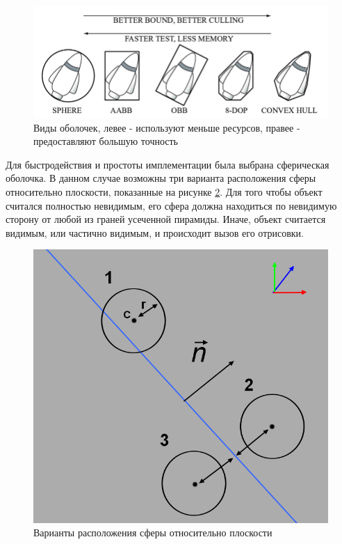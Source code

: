 \begin{figure}[H]
	\begin{center}
		\includegraphics[scale=0.5]{img/frust_casing.png}
	\end{center}
	\captionsetup{justification=centering}
	\caption{Виды оболочек, левее - используют меньше ресурсов, правее - предоставляют большую точность}
	\label{img:frustum_casing}
\end{figure}

Для быстродействия и простоты имплементации была выбрана сферическая оболочка. В данном случае возможны три варианта 
расположения сферы относительно плоскости, показанные на рисунке \ref{img:frustum_sphere}. Для того чтобы объект считался полностью невидимым, его
сфера должна находиться по невидимую сторону от любой из граней усеченной пирамиды. Иначе, объект считается видимым, или частично видимым, и происходит вызов его отрисовки.

\begin{figure}[H]
	\begin{center}
		\includegraphics[scale=0.5]{img/frust_3.png}
	\end{center}
	\captionsetup{justification=centering}
	\caption{Варианты расположения сферы относительно плоскости}
	\label{img:frustum_sphere}
\end{figure}

